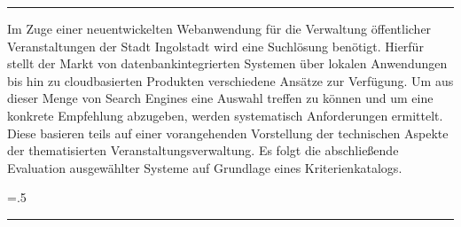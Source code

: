 
\cleardoublepage
{}
\begingroup
\let\clearpage\relax
\let\cleardoublepage\relax
\let\cleardoublepage\relax

\par\vspace*{\fill}

\centering
{\normalfont\Large\sffamily  {}}
\par

\vspace*{0.3\baselineskip}

\centering
\noindent\rule{0.7\textwidth}{1pt}

\vspace*{1\baselineskip}

\par

\centering
\parbox{0.75\textwidth}{
\sffamily
Im Zuge einer neuentwickelten Webanwendung für die Verwaltung öffentlicher Veranstaltungen der Stadt Ingolstadt wird eine Suchlösung benötigt. Hierfür stellt der Markt von datenbankintegrierten Systemen über lokalen Anwendungen bis hin zu cloudbasierten Produkten verschiedene Ansätze zur Verfügung. Um aus dieser Menge von Search Engines eine Auswahl treffen zu können und um eine konkrete Empfehlung abzugeben, werden systematisch Anforderungen ermittelt. Diese basieren teils auf einer vorangehenden Vorstellung der technischen Aspekte der thematisierten Veranstaltungsverwaltung. Es folgt die abschließende Evaluation ausgewählter Systeme auf Grundlage eines Kriterienkatalogs.
{\parfillskip=0pt \emergencystretch=.5\textwidth \par}
}
\vspace*{1\baselineskip}

\centering
\noindent\rule{0.7\textwidth}{1pt}


\par\vspace*{\fill}
\endgroup
